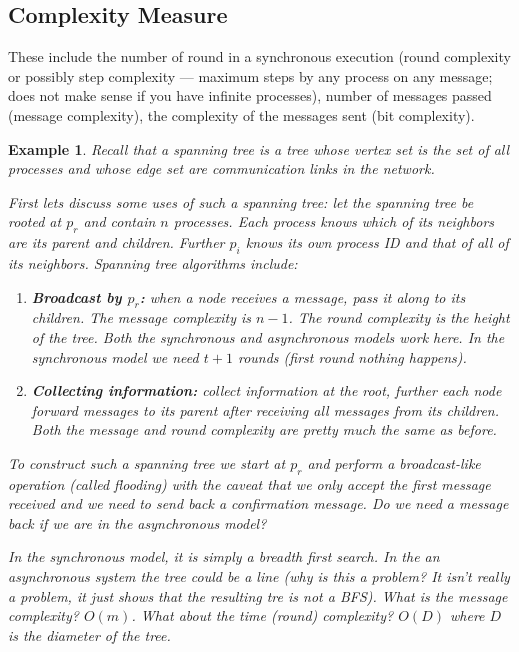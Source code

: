 \documentclass[twoside]{article}
\newtheorem{example}[theorem]{Example}
\begin{document}
\subsection{Complexity Measure}
These include the number of round in a synchronous execution (round complexity or possibly step complexity --- maximum steps by any process on any message; does not make sense if you have infinite processes), number of messages passed (message complexity), the complexity of the messages sent (bit complexity).

\begin{example}
Recall that a spanning tree is a tree whose vertex set is the set of all processes and whose edge set are communication links in the network.

First lets discuss some uses of such a spanning tree: let the spanning tree be rooted at $p_r$ and contain $n$ processes. Each process knows which of its neighbors are its parent and children. Further $p_i$ knows its own process ID and that of all of its neighbors. Spanning tree algorithms include:
\begin{enumerate}
\item \textbf{Broadcast by $p_r$:} when a node receives a message, pass it along to its children. The message complexity is $n-1$. The round complexity is the height of the tree. Both the synchronous and asynchronous models work here. In the synchronous model we need $t+1$ rounds (first round nothing happens). 
\item \textbf{Collecting information:} collect information at the root, further each node forward messages to its parent after receiving all messages from its children. Both the message and round complexity are pretty much the same as before.
\end{enumerate}

To construct such a spanning tree we start at $p_r$ and perform a broadcast-like operation  (called flooding) with the caveat that we only accept the first message received and we need to send back a confirmation message. Do we need a message back if we are in the asynchronous model? 

In the synchronous model, it is simply a breadth first search. In the an asynchronous system the tree could be a line (why is this a problem? It isn't really a problem, it just shows that the resulting tre is not a BFS). What is the message complexity? $O(m)$. What about the time (round) complexity? $O(D)$ where $D$ is the diameter of the tree. 


\end{example}
\end{document}

